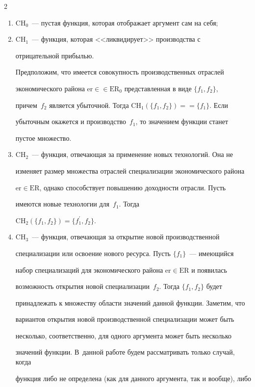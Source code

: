 \begin{multicols}{2}
\begin{enumerate}[1)]
\item CH$_0$~--- пустая функция, которая отображает аргумент сам на себя;


\item CH$_1$~--- функция, которая <<ликвидирует>> производства с 


отрицательной прибылью.


Предположим, что имеется совокупность про\-извод\-ственных отраслей 


экономического \mbox{района} $\mathrm{er}\in$\linebreak $\in  \mathrm{ER}_0$ представленная в виде $\{f_1,f_2\}$, 


причем~$f_2$ является убыточной. Тогда CH$_1(\{f_1,f_2\})=$\linebreak $=\{f_1\}$. Если 


убыточным окажется и производство~$f_1$, то значением функции станет 


пустое множество.


\item CH$_2$~--- функция, отвечающая за применение новых технологий. Она не 


изменяет размер множества отраслей специализации экономического района 


$\mathrm{er}\in \mathrm{ER}$, однако способствует повышению доходности отрасли. Пусть 


имеются новые технологии для~$f_1$. Тогда 


CH$_2(\{f_1,f_2\})=\{f_1^\prime,f_2\}$.


\item CH$_3$~--- функция, отвечающая за открытие новой производственной 


специализации или освоение нового ресурса. Пусть $\{f_1\}$~--- имеющийся 


набор специализаций для экономического района $\mathrm{er}\in \mathrm{ER}$ и появилась 


возможность открытия новой специализации~$f_2$. Тогда $\{f_1,f_2\}$ будет 


принадлежать к множеству об\-ласти значений данной функции. Заметим, что 


вариантов открытия новой производственной специализации может быть 


несколько, соответственно, для одного аргумента может быть несколько 


значений функции. В~данной работе будем рассматривать только случай, когда 


функция либо не определена (как для данного аргумента, так и вообще), либо 



\end{enumerate}
\end{multicols}
